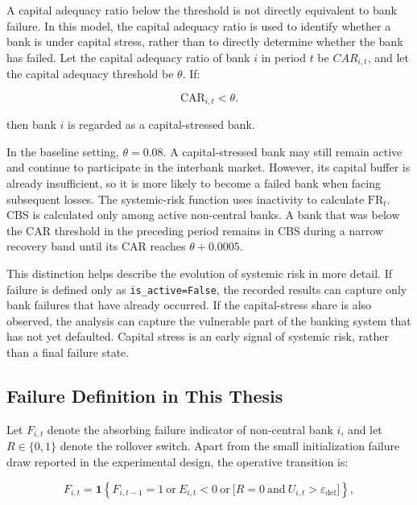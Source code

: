 A capital adequacy ratio below the threshold is not directly equivalent
to bank failure. In this model, the capital adequacy ratio is used to
identify whether a bank is under capital stress, rather than to directly
determine whether the bank has failed. Let the capital adequacy ratio of
bank \(i\) in period \(t\) be \(CAR_{i,t}\), and let the capital
adequacy threshold be \(\theta\). If:


\begin{equation}
\mathrm{CAR}_{i,t}<\theta.
\end{equation}


then bank \(i\) is regarded as a capital-stressed bank.

In the baseline setting, \(\theta = 0.08\). A
capital-stressed bank may still remain active and continue to
participate in the interbank market. However, its capital buffer is
already insufficient, so it is more likely to become a failed bank when
facing subsequent losses. The systemic-risk function uses inactivity to
calculate \(\mathrm{FR}_t\). CBS is calculated only among active
non-central banks. A bank that was below the CAR threshold in the
preceding period remains in CBS during a narrow recovery band until its
CAR reaches \(\theta+0.0005\).

This distinction helps describe the evolution of systemic risk in more
detail. If failure is defined only as \texttt{is\_active=False}, the recorded
results can capture only bank failures that have already occurred. If
the capital-stress share is also observed, the analysis can capture the
vulnerable part of the banking system that has not yet defaulted.
Capital stress is an early signal of systemic risk, rather than a final
failure state.

\subsection{Failure Definition in This Thesis}

Let \(F_{i,t}\) denote the absorbing failure indicator of non-central bank
\(i\), and let \(R\in\{0,1\}\) denote the rollover switch. Apart from the
small initialization failure draw reported in the experimental design,
the operative transition is:


\begin{equation}
F_{i,t}=\mathbf{1}\left\{
F_{i,t-1}=1
\ \text{or}\ E_{i,t}<0
\ \text{or}\ \bigl[R=0\ \text{and}\ U_{i,t}>\varepsilon_{\mathrm{def}}\bigr]
\right\},
\label{eq:failure-indicator}
\end{equation}

